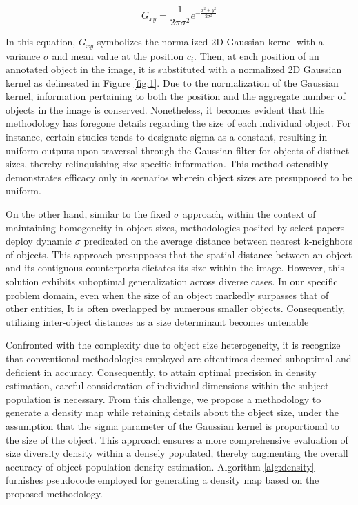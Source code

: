 \documentclass[journal]{IEEEtran}
\begin{document}
\begin{equation}
        G_{xy} = \frac{1}{2\pi\sigma^2}e^{-\frac{x^2+y^2}{2\sigma^2}}
        \label{eq: 3}
\end{equation}

In this equation, $G_{xy}$ symbolizes the normalized 2D Gaussian kernel with a variance $\sigma$ and mean value at the position $c_i$. Then, at each position of an annotated object in the image, it is substituted with a normalized 2D Gaussian kernel as delineated in Figure \ref*{fig:1}. Due to the normalization of the Gaussian kernel, information pertaining to both the position and the aggregate number of objects in the image is conserved. Nonetheless, it becomes evident that this methodology has foregone details regarding the size of each individual object. For instance, certain studies tends to designate sigma as a constant, resulting in uniform outputs upon traversal through the Gaussian filter for objects of distinct sizes, thereby relinquishing size-specific information. This method ostensibly demonstrates efficacy only in scenarios wherein object sizes are presupposed to be uniform.

On the other hand, similar to the fixed $\sigma$ approach, within the context of maintaining homogeneity in object sizes, methodologies posited by select papers \cite{hu2022deep,mcnn} deploy dynamic $\sigma$ predicated on the average distance between nearest k-neighbors of objects. This approach presupposes that the spatial distance between an object and its contiguous counterparts dictates its size within the image. However, this solution exhibits suboptimal generalization across diverse cases. In our specific problem domain, even when the size of an object markedly surpasses that of other entities, It is often overlapped by numerous smaller objects. Consequently, utilizing inter-object distances as a size determinant becomes untenable

Confronted with the complexity due to object size heterogeneity, it is  recognize that conventional methodologies employed are oftentimes deemed suboptimal and deficient in accuracy. Consequently, to attain optimal precision in density estimation, careful consideration of individual dimensions within the subject population is necessary. From this challenge, we propose a methodology to generate a density map while retaining details about the object size, under the assumption that the sigma parameter of the Gaussian kernel is proportional to the size of the object. This approach ensures a more comprehensive evaluation of size diversity density within a densely populated, thereby augmenting the overall accuracy of object population density estimation. Algorithm \ref{alg:density} furnishes pseudocode employed for generating a density map based on the proposed methodology.
\end{document}
